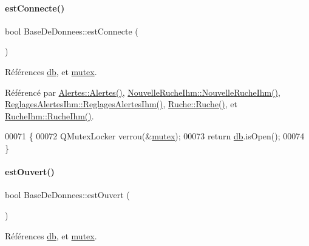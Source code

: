 \paragraph{\texorpdfstring{est\+Connecte()}{estConnecte()}}
{\footnotesize\ttfamily bool Base\+De\+Donnees\+::est\+Connecte (\begin{DoxyParamCaption}{ }\end{DoxyParamCaption})}



Références \hyperlink{class_base_de_donnees_a3e738dcf443370c46a541677ab619f06}{db}, et \hyperlink{class_base_de_donnees_aa1b4696fac87a740f914aa73739086f2}{mutex}.



Référencé par \hyperlink{class_alertes_ad2e4e3907f97bdd06840dfeee0a87ddb}{Alertes\+::\+Alertes()}, \hyperlink{class_nouvelle_ruche_ihm_a338b9af0b96ed0839a8d5008c8c89cc4}{Nouvelle\+Ruche\+Ihm\+::\+Nouvelle\+Ruche\+Ihm()}, \hyperlink{class_reglages_alertes_ihm_ae6337f2d05a3184e48bf5022a91f06c7}{Reglages\+Alertes\+Ihm\+::\+Reglages\+Alertes\+Ihm()}, \hyperlink{class_ruche_a8b4ee3752d984c5acee93b990db7939a}{Ruche\+::\+Ruche()}, et \hyperlink{class_ruche_ihm_a04c2544ba4e9cca6c38f553c32d63dee}{Ruche\+Ihm\+::\+Ruche\+Ihm()}.


\begin{DoxyCode}
00071 \{
00072     QMutexLocker verrou(&\hyperlink{class_base_de_donnees_aa1b4696fac87a740f914aa73739086f2}{mutex});
00073     \textcolor{keywordflow}{return} \hyperlink{class_base_de_donnees_a3e738dcf443370c46a541677ab619f06}{db}.isOpen();
00074 \}
\end{DoxyCode}
\mbox{\label{class_base_de_donnees_af9ac332082ffd0dd35e412cefabe5e9c}} 
\paragraph{\texorpdfstring{est\+Ouvert()}{estOuvert()}}
{\footnotesize\ttfamily bool Base\+De\+Donnees\+::est\+Ouvert (\begin{DoxyParamCaption}{ }\end{DoxyParamCaption})}



Références \hyperlink{class_base_de_donnees_a3e738dcf443370c46a541677ab619f06}{db}, et \hyperlink{class_base_de_donnees_aa1b4696fac87a740f914aa73739086f2}{mutex}.


